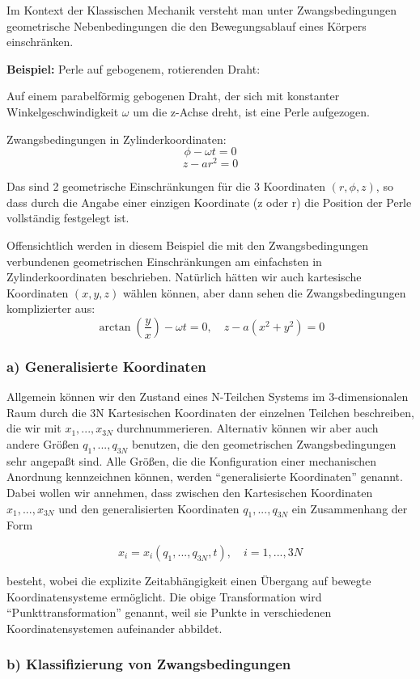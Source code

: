 \documentclass[10pt, letterpaper]{article}
\begin{document}
Im Kontext der Klassischen Mechanik versteht man unter Zwangsbedingungen geometrische Nebenbedingungen die den Bewegungsablauf eines Körpers einschränken.

\textbf{Beispiel:} Perle auf gebogenem, rotierenden Draht:

Auf einem parabelförmig gebogenen Draht, der sich mit konstanter Winkelgeschwindigkeit $\omega$ um die z-Achse dreht, ist eine Perle aufgezogen.

Zwangsbedingungen in Zylinderkoordinaten:
\[\phi - \omega t = 0\]
\[z - ar^2 = 0\]

Das sind 2 geometrische Einschränkungen für die 3 Koordinaten $(r,\phi,z)$, so dass durch die Angabe einer einzigen Koordinate (z oder r) die Position der Perle vollständig festgelegt ist.

Offensichtlich werden in diesem Beispiel die mit den Zwangsbedingungen verbundenen geometrischen Einschränkungen am einfachsten in Zylinderkoordinaten beschrieben. Natürlich hätten wir auch kartesische Koordinaten $(x,y,z)$ wählen können, aber dann sehen die Zwangsbedingungen komplizierter aus:
\[\arctan(\frac{y}{x})-\omega t = 0, \quad z-a(x^2+y^2) = 0\]



\subsubsection{a) Generalisierte Koordinaten}

Allgemein können wir den Zustand eines N-Teilchen Systems im 3-dimensionalen Raum durch die 3N Kartesischen Koordinaten der einzelnen Teilchen beschreiben, die wir mit $x_1,...,x_{3N}$ durchnummerieren. Alternativ können wir aber auch andere Größen $q_1,...,q_{3N}$ benutzen, die den geometrischen Zwangsbedingungen sehr angepaßt sind. Alle Größen, die die Konfiguration einer mechanischen Anordnung kennzeichnen können, werden ``generalisierte Koordinaten'' genannt. Dabei wollen wir annehmen, dass zwischen den Kartesischen Koordinaten $x_1,...,x_{3N}$ und den generalisierten Koordinaten $q_1,...,q_{3N}$ ein Zusammenhang der Form

\[x_i = x_i(q_1,...,q_{3N},t), \quad i=1,...,3N\]

besteht, wobei die explizite Zeitabhängigkeit einen Übergang auf bewegte Koordinatensysteme ermöglicht. Die obige Transformation wird ``Punkttransformation'' genannt, weil sie Punkte in verschiedenen Koordinatensystemen aufeinander abbildet.

\subsubsection{b) Klassifizierung von Zwangsbedingungen}
\end{document}
